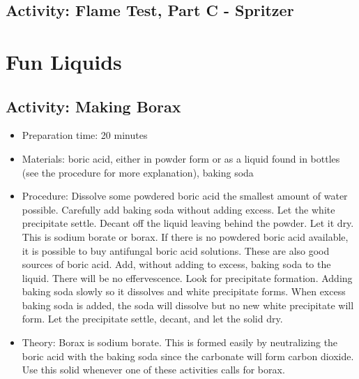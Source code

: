 \begin{itemize}
{\begin{itemize}
\subsection{Activity: Flame Test, Part C - Spritzer}

\section{Fun Liquids}

\subsection{Activity: Making Borax}
\begin{itemize}
\item{Preparation time: 20 minutes}
\item{Materials: boric acid, either in powder form or as a liquid found in bottles (see the procedure for more explanation), baking soda}
\item{Procedure: Dissolve some powdered boric acid the smallest amount of water possible. Carefully add baking soda without adding excess. Let the white precipitate settle. Decant off the liquid leaving behind the powder. Let it dry. This is sodium borate or borax. If there is no powdered boric acid available, it is possible to buy antifungal boric acid solutions. These are also good sources of boric acid. Add, without adding to excess, baking soda to the liquid. There will be no effervescence. Look for precipitate formation. Adding baking soda slowly so it dissolves and white precipitate forms. When excess baking soda is added, the soda will dissolve but no new white precipitate will form. Let the precipitate settle, decant, and let the solid dry. }
\item{Theory: Borax is sodium borate. This is formed easily by neutralizing the boric acid with the baking soda since the carbonate will form carbon dioxide. Use this solid whenever one of these activities calls for borax.}
\end{itemize}


\end{itemize}}
\end{itemize}
